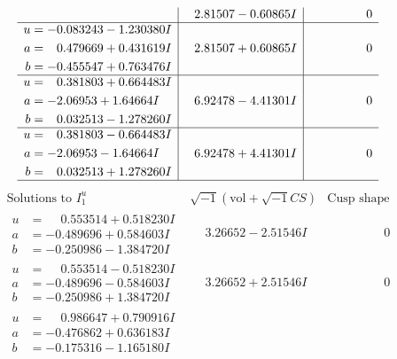 \documentclass[1p]{elsarticle_modified}
\theoremstyle{definition}
\newcommand{\I}{\sqrt{-1}}
\begin{document}
$$\begin{array}{c|c|c}
 & \phantom{-}2.81507 - 0.60865 I & \phantom{-0.000000 } 0 \\ \hline\begin{aligned}
u &= -0.083243 - 1.230380 I \\
a &= \phantom{-}0.479669 + 0.431619 I \\
b &= -0.455547 + 0.763476 I\end{aligned}
 & \phantom{-}2.81507 + 0.60865 I & \phantom{-0.000000 } 0 \\ \hline\begin{aligned}
u &= \phantom{-}0.381803 + 0.664483 I \\
a &= -2.06953 + 1.64664 I \\
b &= \phantom{-}0.032513 - 1.278260 I\end{aligned}
 & \phantom{-}6.92478 - 4.41301 I & \phantom{-0.000000 } 0 \\ \hline\begin{aligned}
u &= \phantom{-}0.381803 - 0.664483 I \\
a &= -2.06953 - 1.64664 I \\
b &= \phantom{-}0.032513 + 1.278260 I\end{aligned}
 & \phantom{-}6.92478 + 4.41301 I & \phantom{-0.000000 } 0\\
 \hline 
 \end{array}$$\newpage$$\begin{array}{c|c|c}  
\text{Solutions to }I^u_{1}& \I (\text{vol} + \sqrt{-1}CS) & \text{Cusp shape}\\
 \hline 
\begin{aligned}
u &= \phantom{-}0.553514 + 0.518230 I \\
a &= -0.489696 + 0.584603 I \\
b &= -0.250986 - 1.384720 I\end{aligned}
 & \phantom{-}3.26652 - 2.51546 I & \phantom{-0.000000 } 0 \\ \hline\begin{aligned}
u &= \phantom{-}0.553514 - 0.518230 I \\
a &= -0.489696 - 0.584603 I \\
b &= -0.250986 + 1.384720 I\end{aligned}
 & \phantom{-}3.26652 + 2.51546 I & \phantom{-0.000000 } 0 \\ \hline\begin{aligned}
u &= \phantom{-}0.986647 + 0.790916 I \\
a &= -0.476862 + 0.636183 I \\
b &= -0.175316 - 1.165180 I\end{aligned}

\end{array}$$
\end{document}
